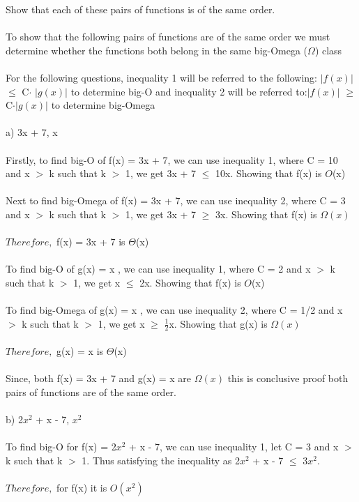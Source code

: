 \documentclass{article}
\begin{document}
Show that each of these pairs of functions is of the same order. \\ \\
To show that the following pairs of functions are of the same order we must determine whether the functions both belong in the same big-Omega ($\Omega$) class \\\\
For the following questions, inequality 1 will be referred to the following: $\left| f(x) \right|$$\leq$ C$\cdot$ $\left| g(x) \right|$ to determine big-O and inequality 2 will be referred to:$\left| f(x) \right|$ $\geq$ C$\cdot$$\left| g(x) \right|$ to determine big-Omega \\ \\
a) 3x + 7, x \\\\
Firstly, to find big-O of f(x) = 3x + 7, we can use inequality 1, where C = 10 and x $>$ k such that k $>$ 1, we get 3x + 7 $\leq$ 10x. Showing that f(x) is $O$(x) \\ \\ 
Next to find big-Omega of f(x) = 3x + 7, we can use inequality 2, where C = 3 and x $>$ k such that k $>$ 1, we get 3x + 7 $\geq$ 3x. Showing that f(x) is $\Omega(x)$\\ \\ 
$Therefore,$ f(x) = 3x + 7 is $\Theta$(x) \\\\
To find big-O of g(x) = x , we can use inequality 1, where C = 2 and x $>$ k such that k $>$ 1, we get x $\leq$ 2x. Showing that f(x) is $O$(x) \\ \\ 
To find big-Omega of g(x) = x , we can use inequality 2, where C = 1/2 and x $>$ k such that k $>$ 1, we get x $\geq$ $\frac{1}{2}$x. Showing that g(x) is $\Omega(x)$\\ \\ 
$Therefore,$ g(x) = x  is $\Theta$(x) \\\\
Since, both f(x) = 3x + 7 and g(x) = x are  $\Omega(x)$ this is conclusive proof both pairs of functions are of the same order. \\\\
b) 2$x^2$ + x - 7, $x^2$ \\ \\
To find big-O for f(x) =  2$x^2$ + x - 7, we can use inequality 1, let C = 3 and x $>$ k such that k $>$ 1. Thus satisfying the inequality as 2$x^2$ + x - 7 $\leq$ 3$x^2$. \\ \\ $Therefore,$ for f(x) it is $O(x^2)$ \\ \\ 
\end{document}
